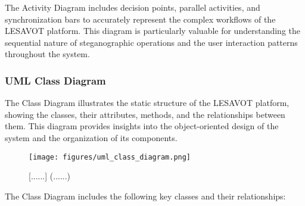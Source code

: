 \documentclass[12pt, a4paper, oneside]{book}
\begin{document}
The Activity Diagram includes decision points, parallel activities, and synchronization bars to accurately represent the complex workflows of the LESAVOT platform. This diagram is particularly valuable for understanding the sequential nature of steganographic operations and the user interaction patterns throughout the system.

\subsubsection{UML Class Diagram}

The Class Diagram illustrates the static structure of the LESAVOT platform, showing the classes, their attributes, methods, and the relationships between them. This diagram provides insights into the object-oriented design of the system and the organization of its components.

\begin{figure}[htbp]
    \centering
    \texttt{[image: figures/uml\_class\_diagram.png]}
    \caption{[......] (......)}
    \label{fig:class_diagram}
\end{figure}

The Class Diagram includes the following key classes and their relationships:
\end{document}
